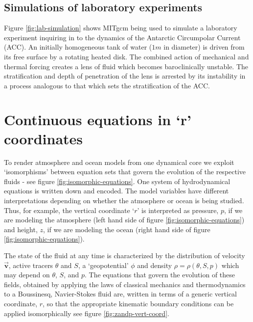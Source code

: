 

\subsection{Simulations of laboratory experiments}

Figure \ref{fig:lab-simulation} shows MITgcm being used to simulate a 
laboratory experiment inquiring in to the dynamics of the Antarctic Circumpolar Current (ACC). An
initially homogeneous tank of water ($1m$ in diameter) is driven from its
free surface by a rotating heated disk. The combined action of mechanical
and thermal forcing creates a lens of fluid which becomes baroclinically
unstable. The stratification and depth of penetration of the lens is
arrested by its instability in a process analogous to that which sets the
stratification of the ACC.




\section{Continuous equations in `r' coordinates}

To render atmosphere and ocean models from one dynamical core we exploit
`isomorphisms' between equation sets that govern the evolution of the
respective fluids - see figure \ref{fig:isomorphic-equations}. 
One system of hydrodynamical equations is written down
and encoded. The model variables have different interpretations depending on
whether the atmosphere or ocean is being studied. Thus, for example, the
vertical coordinate `$r$' is interpreted as pressure, $p$, if we are
modeling the atmosphere (left hand side of figure \ref{fig:isomorphic-equations})
and height, $z$, if we are modeling the ocean (right hand side of figure
\ref{fig:isomorphic-equations}).



The state of the fluid at any time is characterized by the distribution of
velocity $\vec{\mathbf{v}}$, active tracers $\theta $ and $S$, a
`geopotential' $\phi $ and density $\rho =\rho (\theta ,S,p)$ which may
depend on $\theta $, $S$, and $p$. The equations that govern the evolution
of these fields, obtained by applying the laws of classical mechanics and
thermodynamics to a Boussinesq, Navier-Stokes fluid are, written in terms of
a generic vertical coordinate, $r$, so that the appropriate
kinematic boundary conditions can be applied isomorphically
see figure \ref{fig:zandp-vert-coord}.

